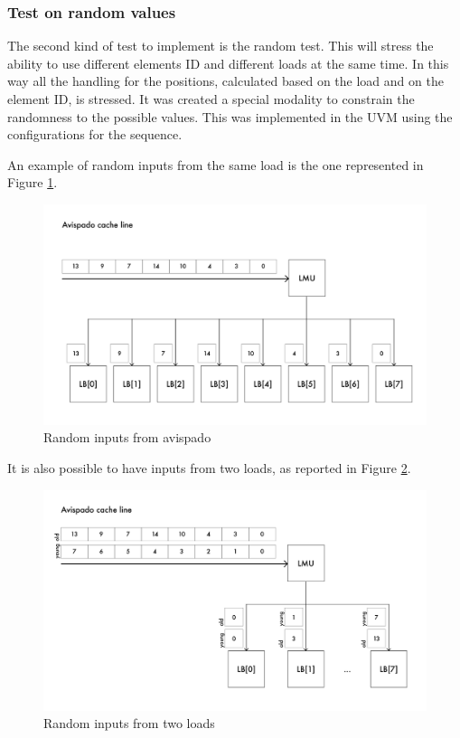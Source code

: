 \subsubsection{Test on random values}
The second kind of test to implement is the random test. This will stress the ability to use different elements ID and different loads at the same time. In this way all the handling for the positions, calculated based on the load and on the element ID, is stressed.
It was created a special modality to constrain the randomness to the possible values. This was implemented in the UVM using the configurations for the sequence.

An example of random inputs from the same load is the one represented in Figure \ref{cache-to-lb-rnd-ex}.

\begin{figure}[H]
    \centering
    \includegraphics[scale = 0.6]{Chapter_2/img/cache-to-lb-rnd-ex.png}
    \caption{Random inputs from avispado}
    \label{cache-to-lb-rnd-ex}
\end{figure}

It is also possible to have inputs from two loads, as reported in Figure \ref{cache-to-lb-ooo-ex}.

\begin{figure}[H]
    \centering
    \includegraphics[scale = 0.6]{Chapter_2/img/cache-to-lb-ooo-ex.png}
    \caption{Random inputs from two loads}
    \label{cache-to-lb-ooo-ex}
\end{figure}


